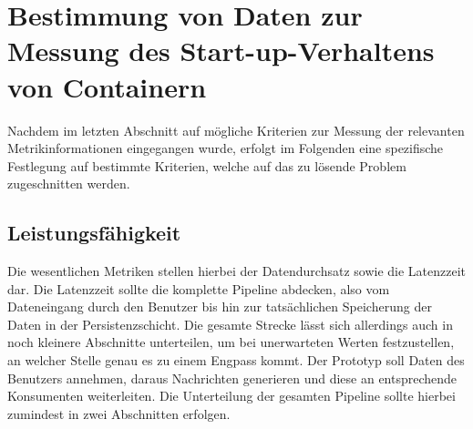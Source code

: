 \section{Bestimmung von Daten zur Messung des Start-up-Verhaltens von Containern}

Nachdem im letzten Abschnitt auf mögliche Kriterien zur Messung der relevanten Metrikinformationen eingegangen wurde, erfolgt im Folgenden eine spezifische Festlegung auf bestimmte Kriterien, welche auf das zu lösende Problem zugeschnitten werden.


\subsection{Leistungsfähigkeit}
Die wesentlichen Metriken stellen hierbei der Datendurchsatz sowie die Latenzzeit dar. Die Latenzzeit sollte die komplette Pipeline abdecken, also vom Dateneingang durch den Benutzer bis hin zur tatsächlichen Speicherung der Daten in der Persistenzschicht. Die gesamte Strecke lässt sich allerdings auch in noch kleinere Abschnitte unterteilen, um bei unerwarteten Werten festzustellen, an welcher Stelle genau es zu einem Engpass kommt. Der Prototyp soll Daten des Benutzers annehmen, daraus Nachrichten generieren und diese an entsprechende Konsumenten weiterleiten. Die Unterteilung der gesamten Pipeline sollte hierbei zumindest in zwei Abschnitten erfolgen.

